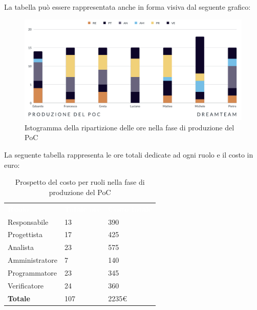 La tabella può essere rappresentata anche in forma visiva dal seguente grafico:
\begin{figure}[H]
\centering
\includegraphics[scale=0.65]{Sezioni/SezioniPreventivo/grafici/Poc.png}
\caption{Istogramma della ripartizione delle ore nella fase di produzione del PoC}
\end{figure}

La seguente tabella rappresenta le ore totali dedicate ad ogni ruolo e il costo in euro:

\begin{table}[H]
\begin{center}
\renewcommand{\arraystretch}{1.5}
\begin{tabular}{ m{}<{\centering}  m{}<{\centering} m{}<{\centering}}
	\rowcolor{darkblue}
	\textcolor{white}{\textbf{Ruolo}}&\textcolor{white}{\textbf{Totale ore}}&\textcolor{white}{\textbf{Costo totale}}\\ 

	Responsabile  & 13 & 390\\	
	
	Progettista & 17 & 425\\
	
	Analista & 23 & 575 \\

	Amministratore & 7 & 140\\
	
	Programmatore & 23 & 345 \\
	
	Verificatore & 24 & 360 \\
	
	\textbf{Totale} & 107 & 2235\euro \\
	
\end{tabular}
\caption{Prospetto del costo per ruoli nella fase di produzione del PoC}
\end{center}
\end{table}

